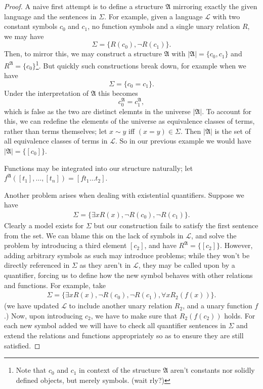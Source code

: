 \documentclass{article}
\theoremstyle{definition}
\begin{document}
\begin{proof}
	A naive first attempt is to define a structure $\mathfrak{A}$ mirroring exactly the given language and the sentences in $\Sigma$. For example, given a language $\mathcal{L}$ with two constant symbols $c_0$ and $c_1$, no function symbols and a single unary relation $R$, we may have \[\Sigma=\{R(c_0),\neg R(c_1)\}.\]
	Then, to mirror this, we may construct a structure $\mathfrak{A}$ with $|\mathfrak{A}|=\{c_0,c_1\}$ and $R^\mathfrak{A}=\{c_0\}$\footnote{Note that $c_0$ and $c_1$ in context of the structure $\mathfrak{A}$ aren't constants nor solidly defined objects, but merely symbols. (wait rly?)}. But quickly such constructions break down, for example when we have \[\Sigma=\{c_0=c_1\}.\] Under the interpretation of $\mathfrak{A}$ this becomes \[c_0^\mathfrak{A}=c_1^\mathfrak{A},\] which is false as the two are distinct elemnts in the universe $|\mathfrak{A}|$. To account for this, we can redefine the elements of the universe as equivalence classes of terms, rather than terms themselves; let $x\sim y$ iff $(x=y)\in \Sigma$. Then $|\mathfrak{A}|$ is the set of all equivalence classes of terms in $\mathcal{L}$. So in our previous example we would have $|\mathfrak{A}|=\{[c_0]\}$.\par
	Functions may be integrated into our structure naturally; let $f^\mathfrak{A}([t_1],\dots,[t_n])=[ft_1\dots t_2]$.\par
	Another problem arises when dealing with existential quantifiers. Suppose we have
	\begin{align*}
		\Sigma=\{\exists x R(x), \neg R(c_0), \neg R(c_1)\}.
	\end{align*}
	Clearly a model exists for $\Sigma$ but our construction fails to satisfy the first sentence from the set. We can blame this on the lack of symbols in $\mathcal{L}$, and solve the problem by introducing a third element $[c_2]$, and have $R^\mathfrak{A}=\{[c_2]\}$. However, adding arbitrary symbols as such may introduce problems; while they won't be directly referenced in $\Sigma$ as they aren't in $\mathcal{L}$, they may be called upon by a quantifier, forcing us to define how the new symbol behaves with other relations and functions. For example, take
	\begin{align*}
		\Sigma=\{\exists x R(x), \neg R(c_0), \neg R(c_1), \forall x R_2(f(x))\}.
	\end{align*}
	(we have updated $\mathcal{L}$ to include another unary relation $R_2$, and a unary function $f$.) Now, upon introducing $c_2$, we have to make sure that $R_2(f(c_2))$ holds. For each new symbol added we will have to check all quantifier sentences in $\Sigma$ and extend the relations and functions appropriately so as to ensure they are still satisfied.


\end{proof}
\end{document}
